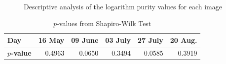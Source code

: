 \documentclass[12pt]{article}
\begin{document}
\begin{figure}[hbt]
  \centering
  \caption{Descriptive analysis of the logarithm purity values for each image}
  \label{fig:desc_analysis}
\end{figure}

\begin{table}[hbt]
  \centering
  \caption{$p$-values from Shapiro-Wilk Test}
  \label{tab:pvalues_purities}
  \begin{tabular}{lrrrrr}
    \toprule
    \textbf{Day} & \textbf{16 May} & \textbf{09 June} & \textbf{03 July} & \textbf{27 July} & \textbf{20 Aug.}\\\midrule
    \textbf{$p$-value} & 0.4963 & 0.0650 & 0.3494 & 0.0585 & 0.3919\\
    \bottomrule
  \end{tabular}
\end{table}
\end{document}
